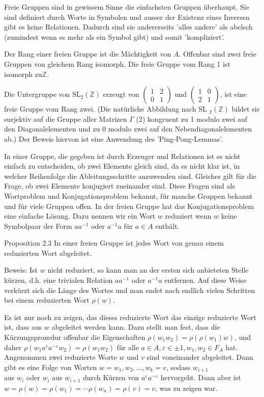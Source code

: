 \documentclass[10pt, letterpaper]{article}
\begin{document}
Freie Gruppen sind in gewissem Sinne die einfachsten Gruppen überhaupt. Sie sind definiert durch Worte in Symbolen und ausser der Existenz eines Inversen gibt es keine Relationen. Dadurch sind sie andererseits 'alles andere' als abelsch (zumindest wenn es mehr als ein Symbol gibt) und somit 'kompliziert'.

Der Rang einer freien Gruppe ist die Mächtigkeit von $A$. Offenbar sind zwei freie Gruppen von gleichem Rang isomorph. Die freie Gruppe vom Rang 1 ist isomorph $\mathrm{zu} \mathbb{Z}$.

Die Untergruppe von $\mathrm{SL}_{2}(\mathbb{Z})$ erzeugt von $\left(\begin{array}{ll}1 & 2 \\ 0 & 1\end{array}\right)$ und $\left(\begin{array}{ll}1 & 0 \\ 2 & 1\end{array}\right)$, ist eine freie Gruppe vom Rang zwei. (Die natürliche Abbildung nach SL ${ }_{2}(\mathbb{Z})$ bildet sie surjektiv auf die Gruppe aller Matrizen $\Gamma$ (2) kongruent zu 1 modulo zwei auf den Diagonalelementen und zu 0 modulo zwei auf den Nebendiagonalelementen ab.) Der Beweis hiervon ist eine Anwendung des 'Ping-Pong-Lemmas'.

In einer Gruppe, die gegeben ist durch Erzeuger und Relationen ist es nicht einfach zu entscheiden, ob zwei Elemente gleich sind, da es nicht klar ist, in welcher Reihenfolge die Ableitungsschritte anzuwenden sind. Gleiches gilt für die Frage, ob zwei Elemente konjugiert zueinander sind. Diese Fragen sind als Wortproblem und Konjugationsproblem bekannt, für manche Gruppen bekannt und für viele Gruppen offen. In der freien Gruppe hat das Konjugationsproblem eine einfache Lösung. Dazu nennen wir ein Wort $w$ reduziert wenn $w$ keine Symbolpaar der Form $a a^{-1}$ oder $a^{-1} a$ für $a \in A$ enthält.

Proposition 2.3 In einer freien Gruppe ist jedes Wort von genau einem reduzierten Wort abgeleitet.

Beweis: Ist $w$ nicht reduziert, so kann man an der ersten sich anbieteten Stelle kürzen, d.h. eine trivialen Relation $a a^{-1}$ oder $a^{-1} a$ entfernen. Auf diese Weise verkürzt sich die Länge des Wortes und man endet nach endlich vielen Schritten bei einem reduzierten Wort $\rho(w)$.

Es ist nur noch zu zeigen, das dieses reduzierte Wort das einzige reduzierte Wort ist, dass aus $w$ abgeleitet werden kann. Dazu stellt man fest, dass die Kürzungsprozedur offenbar die Eigenschaften $\rho\left(w_{1} w_{2}\right)=\rho\left(\rho\left(w_{1}\right) w\right)$, und daher $\rho\left(w_{1} a^{\varepsilon} a^{-\varepsilon} w_{2}\right)=\rho\left(w_{1} w_{2}\right)$ für alle $a \in A, \varepsilon \in \pm 1, w_{1}, w_{2} \in F_{A}$ hat. Angenommen zwei reduzierte Worte $w$ und $v$ sind voneinander abgeleitet. Dann gibt es eine Folge von Worten $w=w_{1}, w_{2}, \ldots, w_{k}=v$, sodass $w_{i+1}$\\
aus $w_{i}$ oder $w_{i}$ aus $w_{i+1}$ durch Kürzen von $a^{\varepsilon} a^{-\varepsilon}$ hervorgeht. Dann aber ist $w=\rho(w)=\rho\left(w_{1}\right)=\cdots \rho\left(w_{n}\right)=\rho(v)=v$, was zu zeigen war.
\end{document}
